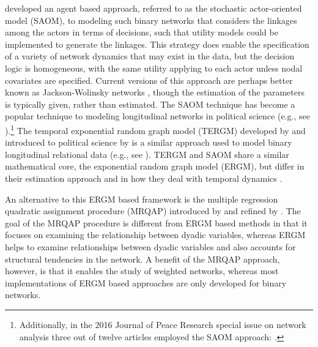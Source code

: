 \documentclass[3p,times,twocolumn,authoryear,12pt]{elsarticle}
\begin{document}
\citet{snijders:2001} developed an agent based approach, referred to as the stochastic actor-oriented model (SAOM), to modeling such binary networks that considers the linkages among the actors in terms of decisions, such that utility models could be implemented to generate the linkages. This strategy does enable the specification of a variety of network dynamics that may exist in the data, but the decision logic is homogeneous, with the same utility applying to each actor unless nodal covariates are specified. Current versions of this approach are perhaps better known as Jackson-Wolinsky networks \citep{jackson:wolinsky:1996}, though the estimation of the parameters is typically given, rather than estimated. The SAOM technique has become a popular technique to modeling longitudinal networks in political science (e.g., see \citealp{manger:etal:2012, kinne:2013, berardo:2013}).\footnote{Additionally, in the 2016 Journal of Peace Research special issue on network analysis three out of twelve articles employed the SAOM approach: \citealp{chyzh:2016, warren:2016, kinne:2016}.} The temporal exponential random graph model (TERGM) developed by \citet{hanneke:xing:2007} and introduced to political science by \citet{cranmer:desmarais:2011} is a similar approach used to model binary longitudinal relational data (e.g., see \citealp{cranmer:desmarais:etal:2012, corbetta2013}). TERGM and SAOM share a similar mathematical core, the exponential random graph model (ERGM), but differ in their estimation approach and in how they deal with temporal dynamics \citep{leifeld:cranmer:2015}. 

An alternative to this ERGM based framework is the multiple regression quadratic assignment procedure (MRQAP) introduced by \citet{krackhardt:1988} and refined by \citet{dekker:etal:2007}. The goal of the MRQAP procedure is different from ERGM based methods in that it focuses on examining the relationship between dyadic variables, whereas ERGM helps to examine relationships between dyadic variables and also accounts for structural tendencies in the network. A benefit of the MRQAP approach, however, is that it enables the study of weighted networks, whereas most implementations of ERGM based approaches are only developed for binary networks. 
\end{document}
